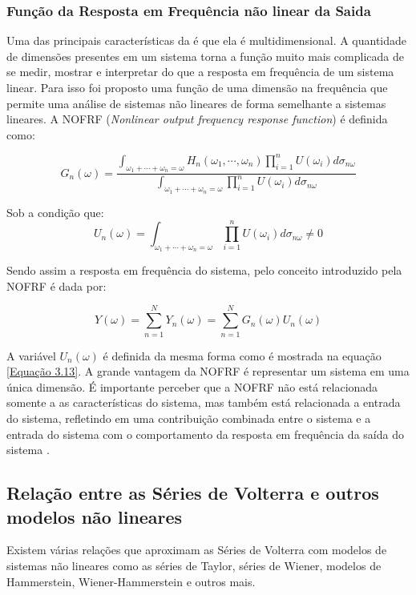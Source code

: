 \subsubsection*{Função da Resposta em Frequência não linear da Saida }
Uma das principais características da \FRFG é que ela é multidimensional. A quantidade de dimensões presentes em um sistema torna a função muito mais complicada de se medir, mostrar e interpretar do que a resposta em frequência de um sistema linear. Para isso foi proposto uma função de uma dimensão na frequência que permite uma análise de sistemas não lineares de forma semelhante a sistemas lineares. A NOFRF (\textit{Nonlinear output frequency response function}) é definida como:

\begin{equation}
G_{n}(\omega) = \dfrac{\int_{\omega_{1}+\cdots+\omega_{n}=\omega}H_{n}(\omega_{1},\cdots,\omega_{n})\prod_{i=1}^{n}U(\omega_{i})d\sigma_{n\omega} }{\int_{\omega_{1}+\cdots+\omega_{n}=\omega}\prod_{i=1}^{n}U(\omega_{i})d\sigma_{n\omega}}
\label{Equação 3.13}
\end{equation}

Sob a condição que:
$$U_{n}(\omega) = \int_{\omega_{1}+\cdots+\omega_{n}=\omega}\prod_{i=1}^{n}U(\omega_{i})d\sigma_{n\omega} \neq 0$$

Sendo assim a resposta em frequência do sistema, pelo conceito introduzido pela NOFRF é dada por:

\begin{equation}
Y(\omega) = \sum_{n=1}^{N} Y_{n}(\omega) = \sum_{n=1}^{N} G_{n}(\omega) U_{n}(\omega)
\label{Equação 3.14}
\end{equation} 

A variável $U_{n}(\omega)$ é definida da mesma forma como é mostrada na equação \ref{Equação 3.13}. A grande vantagem da NOFRF é representar um sistema em uma única dimensão. É importante perceber que a NOFRF não está relacionada somente a as características do sistema, mas também está relacionada a entrada do sistema, refletindo em uma contribuição combinada entre o sistema e a entrada do sistema com o comportamento da resposta em frequência da saída do sistema \cite{cheng2017volterra}.	

\subsection*{Relação entre as Séries de Volterra e outros modelos não lineares}
Existem várias relações que aproximam as Séries de Volterra com modelos de sistemas não lineares como as séries de Taylor, séries de Wiener, modelos de Hammerstein, Wiener-Hammerstein e outros mais.

